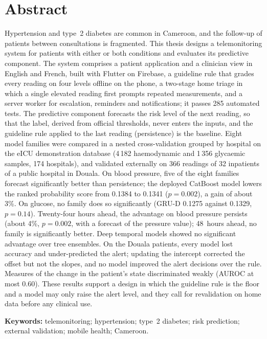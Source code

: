\chapter*{Abstract}
Hypertension and type~2 diabetes are common in Cameroon, and the follow-up of patients between consultations is fragmented. This thesis designs a telemonitoring system for patients with either or both conditions and evaluates its predictive component. The system comprises a patient application and a clinician view in English and French, built with Flutter on Firebase, a guideline rule that grades every reading on four levels offline on the phone, a two-stage home triage in which a single elevated reading first prompts repeated measurements, and a server worker for escalation, reminders and notifications; it passes 285 automated tests. The predictive component forecasts the risk level of the next reading, so that the label, derived from official thresholds, never enters the inputs, and the guideline rule applied to the last reading (persistence) is the baseline. Eight model families were compared in a nested cross-validation grouped by hospital on the eICU demonstration database (4\,182 haemodynamic and 1\,356 glycaemic samples, 174 hospitals), and validated externally on 366 readings of 32 inpatients of a public hospital in Douala. On blood pressure, five of the eight families forecast significantly better than persistence; the deployed CatBoost model lowers the ranked probability score from 0.1384 to 0.1341 ($p = 0.002$), a gain of about 3\%. On glucose, no family does so significantly (GRU-D 0.1275 against 0.1329, $p = 0.14$). Twenty-four hours ahead, the advantage on blood pressure persists (about 4\%, $p = 0.002$, with a forecast of the pressure value); 48~hours ahead, no family is significantly better. Deep temporal models showed no significant advantage over tree ensembles. On the Douala patients, every model lost accuracy and under-predicted the alert; updating the intercept corrected the offset but not the slopes, and no model improved the alert decisions over the rule. Measures of the change in the patient's state discriminated weakly (AUROC at most 0.60). These results support a design in which the guideline rule is the floor and a model may only raise the alert level, and they call for revalidation on home data before any clinical use.

\medskip
\noindent\textbf{Keywords:} telemonitoring; hypertension; type~2 diabetes; risk prediction; external validation; mobile health; Cameroon.

